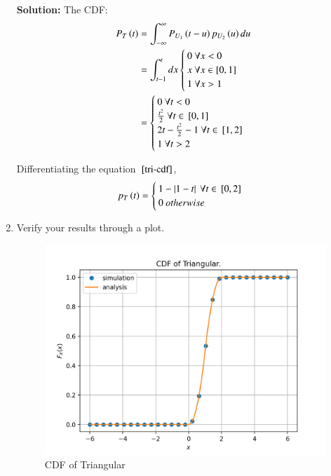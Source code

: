 \documentclass[journal,12pt,twocolumn]{IEEEtran}
\renewcommand\thesection{\arabic{section}}
\providecommand{\sbrak}[1]{\ensuremath{{}\left[#1\right]}}
\theoremstyle{remark}
\providecommand{\abs}[1]{\left\vert#1\right\vert}
\newcommand{\solution}{\noindent \textbf{Solution: }}
\numberwithin{equation}{section}
\numberwithin{equation}{section}
\begin{document}
\begin{enumerate}[label=\thesection.\arabic*,ref=\thesection.\theenumi]
\solution
The CDF:
\begin{align}
    \cdf{t}{T} &= \int_{-\infty}^\infty \cdf{t - u}{U_1} \pdf{u}{U_2} du \nonumber \\
    &= \int_{t - 1}^t dx \begin{cases}
        0\ \forall x < 0 \\
				x\ \forall x \in [0, 1] \\
				1\ \forall x > 1
    \end{cases} \\
&= \begin{cases}
    0\ \forall t < 0 \\
    \frac{t^2}{2}\ \forall t \in \sbrak{0, 1} \\
    2t - \frac{t^2}{2} - 1\ \forall t \in \sbrak{1, 2} \\
    1\ \forall t > 2
\end{cases} \label{tri-cdf}
\end{align}

Differentiating the equation $~\eqref{tri-cdf}$, 
\begin{align}
    \pdf{t}{T} = \begin{cases}
        1 - \abs{1 - t} \ \forall t \in \sbrak{0, 2} \\
        0\ otherwise
    \end{cases} \label{tri-pdf}
\end{align}

\newpage
\item Verify your results through a plot. 
\begin{figure}[!h]
    \caption{CDF of Triangular}
    \includegraphics[width = \columnwidth]{tri.png}
\end{figure}


\end{enumerate}
\end{document}
